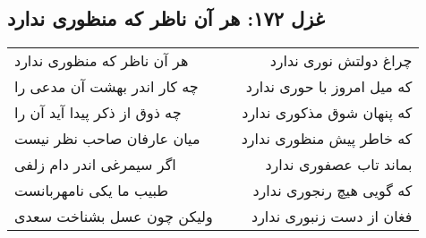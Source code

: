 \begin{center}
\section*{غزل ۱۷۲: هر آن ناظر که منظوری ندارد}
\label{sec:172}
\begin{longtable}{l p{0.5cm} r}
هر آن ناظر که منظوری ندارد
&&
چراغ دولتش نوری ندارد
\\
چه کار اندر بهشت آن مدعی را
&&
که میل امروز با حوری ندارد
\\
چه ذوق از ذکر پیدا آید آن را
&&
که پنهان شوق مذکوری ندارد
\\
میان عارفان صاحب نظر نیست
&&
که خاطر پیش منظوری ندارد
\\
اگر سیمرغی اندر دام زلفی
&&
بماند تاب عصفوری ندارد
\\
طبیب ما یکی نامهربانست
&&
که گویی هیچ رنجوری ندارد
\\
ولیکن چون عسل بشناخت سعدی
&&
فغان از دست زنبوری ندارد
\\
\end{longtable}
\end{center}
